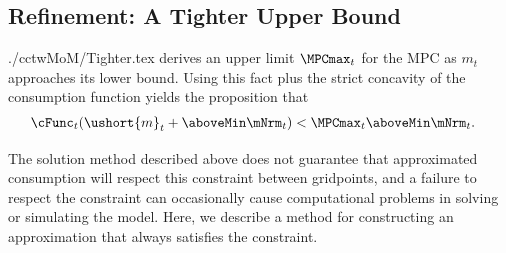 \documentclass[titlepage, headings=optiontotocandhead]{\econtex}
\begin{document}
\hypertarget{Refinement-A-Tighter-Upper-Bound}{}
\subsection{Refinement: A Tighter Upper Bound}
\begin{verbatimwrite}{./cctwMoM/Tighter.tex}
  \cite{BufferStockTheory} derives an upper limit  $\MPCmax_{t}$ for the MPC as $m_{t}$
  approaches its lower bound.  Using this 
  fact plus the strict concavity of the consumption function yields the
  proposition that 
  \begin{equation}\begin{gathered}\begin{aligned}
        \cFunc_{t}(\ushort{m}_{t}+\aboveMin \mNrm_{t}) & < \MPCmax_{t} \aboveMin \mNrm_{t}.
      \end{aligned}\end{gathered}\end{equation}

  The solution method described above does not guarantee that
  approximated consumption will respect this constraint between gridpoints, and a failure to 
  respect the constraint can occasionally cause computational problems in solving
  or simulating the model.  Here, we 
  describe a method for constructing an approximation that always
  satisfies the constraint.

\end{verbatimwrite}
\end{document}
